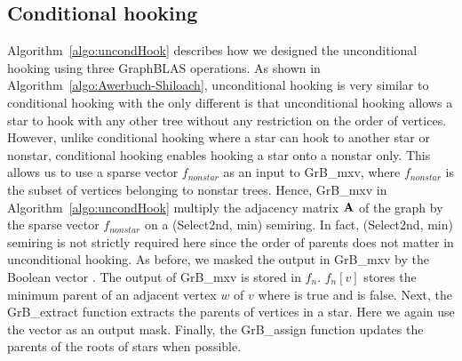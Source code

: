 \subsection{Conditional hooking}
Algorithm~\ref{algo:uncondHook} describes how we designed the unconditional hooking using three GraphBLAS operations.
As shown in Algorithm~\ref{algo:Awerbuch-Shiloach},  unconditional hooking is very similar to conditional hooking  with the only different is that unconditional hooking allows a star to hook with any other tree without any restriction on the order of vertices.
However, unlike conditional hooking where a star can hook to another star or nonstar, conditional hooking enables hooking a star onto a nonstar only. 
This allows us to use a sparse vector $f_{nonstar}$ as an input to GrB\_mxv, where $f_{nonstar}$ is the subset of vertices belonging to nonstar trees. 
Hence, GrB\_mxv in  Algorithm~\ref{algo:uncondHook} multiply the adjacency matrix $\mathbf{A}$ of the graph by the sparse vector $f_{nonstar}$ on a (Select2nd, min) semiring. 
In fact, (Select2nd, min) semiring is not strictly required here since the order of parents does not matter in unconditional hooking.
As before, we masked the output in GrB\_mxv by the Boolean vector .
The output of GrB\_mxv is stored in $f_n$.  $f_n[v]$ stores the minimum parent of an adjacent vertex $w$ of $v$ where  is true and  is false.  
Next, the GrB\_extract function extracts the parents of vertices in a star. Here we again use the  vector as an output mask.
Finally, the GrB\_assign function updates the parents of the roots of stars when possible.



